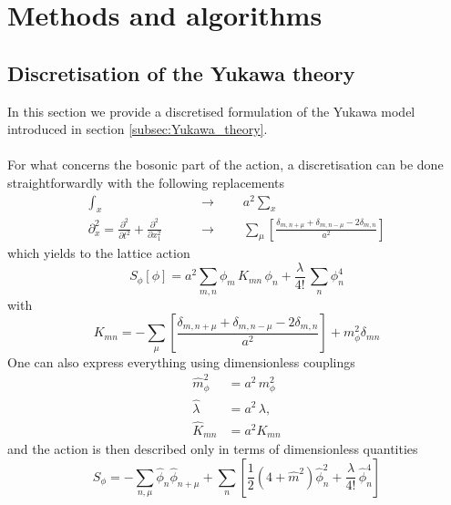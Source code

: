 
\chapter{Methods and algorithms}
\label{chapt:methods}

\section{Discretisation of the Yukawa theory}
\label{sec:lattice_discretisation}

In this section we provide a discretised formulation of the Yukawa model introduced in section \ref{subsec:Yukawa_theory}. \\~\\
For what concerns the bosonic part of the action, a discretisation can be done straightforwardly with the following replacements
\begin{equation*}
    \begin{aligned}
        \int_x \qquad &\to \qquad a^2 \sum_x \\
        \partial^2_x = \frac{\partial^2}{\partial t^2} + \frac{\partial^2}{\partial x_1^2} \qquad &\to \qquad \sum_\mu \left[\frac{\delta_{m,n+\mu} + \delta_{m,n-\mu} - 2 \delta_{m,n}}{a^2}\right]
    \end{aligned}
\end{equation*}
which yields to the lattice action
\begin{equation*}
        S_\phi [\phi] =  a^2 \sum_{m,n} \phi_m \, K_{mn} \, \phi_n + \frac{\lambda}{4!} \, \sum_n \phi_n^4 
\end{equation*}
with 
\begin{equation*}
    K_{mn} = - \sum_\mu \left[\frac{\delta_{m,n+\mu} + \delta_{m,n-\mu} - 2 \delta_{m,n}}{a^2}\right] + m_\phi^2 \delta_{mn} 
\end{equation*}
One can also express everything using dimensionless couplings
\begin{equation}
    \begin{aligned}
        \hat m_\phi^2 &= a^2 \, m_\phi^2 \\
        \hat \lambda &= a^{2} \, \lambda, \\
        \hat K_{mn} &= a^2 K_{mn}
    \end{aligned}
    \label{eq:couplings_redefitinion}
\end{equation}
and the action is then described only in terms of dimensionless quantities
\begin{equation*}
    S_\phi=-\sum_{n, \mu} \hat\phi_n \hat\phi_{n+\mu}+\sum_n\left[\frac{1}{2}\left(4+\hat m^2\right) \hat\phi_n^2 +\frac{\hat\lambda}{4 !} \, \hat\phi_n^4\right]
\end{equation*}
